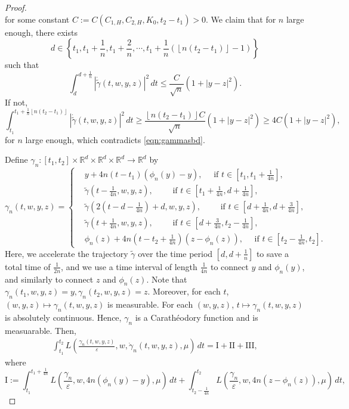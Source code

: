 \documentclass[reqno,11pt]{amsart}
\numberwithin{equation}{section}
\newcommand{\R}{\mathbb{R}} %
\begin{document}
\begin{proof}
\begin{equation}
\end{equation}
for some constant $ C:=C(C_{1,H}, C_{2, H}, K_0,t_2-t_1)>0$. We claim that for $n$ large enough, there exists \[
d\in \left\{t_1, t_1+\frac{1}{n}, t_1+\frac{2}{n}, \cdots, t_1+\frac{1}{n} \left(\left\lfloor n\left(t_2-t_1\right) \right\rfloor-1\right)\right\}
\]
such that
\begin{equation}\label{eqn:gammadotnbd}
   \int_{d}^{d+\frac{1}{n}} \left|\dot{\tilde{\gamma}}(t,w,y,z)\right|^2\,dt\leq  \frac{C}{\sqrt{n}} \left(1+|y-z|^2\right).
\end{equation}
If not,
\[
    \int_{t_1}^{t_1+\frac{1}{n}\left\lfloor n\left(t_2-t_1\right) \right\rfloor} \left|\dot{\tilde{\gamma}}(t,w,y,z)\right|^2\,dt\geq \frac{\left\lfloor n\left(t_2-t_1\right) \right\rfloor C}{\sqrt{n}} \left(1+|y-z|^2\right)\geq 4C\left(1+|y-z|^2\right),
\]
for $n$ large enough, which contradicts \eqref{eqn:gammasbd}.


Define $\gamma_n:[t_1, t_2] \times \R^d  \times \R^d \times \R^d\to \R^d$ by
\[
   \gamma_n(t,w,y,z) = \left\{\begin{aligned}
   & y+4n(t-t_1)(\phi_n(y)-y), \quad  \text{ if } t\in \left[t_1, t_1+\frac{1}{4n}\right], \\
   &\tilde{\gamma}\left(t-\frac{1}{4n},w,y,z\right), \qquad  \text{ if } t \in \left[t_1+\frac{1}{4n},d+\frac{1}{4n}\right],\\
   &\tilde{\gamma}\left(
2\left(t-d -\frac{1}{4n}\right) +d,w,y,z\right), \qquad  \text{ if } t \in \left[d+\frac{1}{4n},d+\frac{3}{4n}\right],\\
   &\tilde{\gamma} \left(t +\frac{1}{4n},w,y,z\right), \qquad  \text{ if } t \in \left[d+\frac{3}{4n},t_2-\frac{1}{4n}\right],\\
   &\phi_n(z)+4n\left(t-t_2+\frac{1}{4n}\right)(z-\phi_n(z)), \quad  \text{ if } t\in \left[t_2-\frac{1}{4n}, t_2\right].
   \end{aligned}
   \right.
\]
Here, we accelerate the trajectory $\tilde{\gamma}$ over the time period $\left[d, d+\frac{1}{n}\right]$ to save a total time of $\frac{1}{2n}$, and we use a time interval of length $\frac{1}{4n}$ to connect $y$ and $\phi_n(y)$, and similarly to connect $z$ and $\phi_n(z)$. Note that $\gamma_n(t_1, w,y,z)=y, \gamma_n(t_2,w,y,z)=z$. Moreover, for each $t$, $(w,y,z)\mapsto \gamma_n(t,w,y,z)$ is measurable. For each $(w,y,z)$, $t \mapsto \gamma_n(t,w,y,z)$ is absolutely continuous. Hence, $ \gamma_n$ is a Carath\'eodory function and is measuarable. Then,
\[
\begin{aligned}
\int_{t_1}^{t_2}
L \left(\frac{\gamma_n(t,w,y,z)}{\varepsilon},w, \dot{\gamma}_n(t, w,y,z), \mu\right)\,dt=\mathrm{I}+\mathrm{II}+\mathrm{III},
\end{aligned}
\]
where
\[
\mathrm{I}:=\int_{t_1}^{t_1+\frac{1}{4n}}
L \left(\frac{\gamma_n}{\varepsilon},w,4n(\phi_n(y)-y),\mu\right)\,dt+
\int_{t_2-\frac{1}{4n}}^{t_2}
L \left(\frac{\gamma_n}{\varepsilon},w,4n(z-\phi_n(z)),\mu\right)\,dt,
\]


\end{proof}
\end{document}
